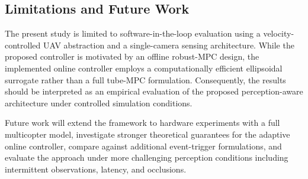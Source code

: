 \documentclass[letterpaper, 10 pt, conference]{ieeeconf}  %
\begin{document}
\subsection{Limitations and Future Work}

The present study is limited to software-in-the-loop evaluation using a velocity-controlled UAV abstraction and a single-camera sensing architecture. While the proposed controller is motivated by an offline robust-MPC design, the implemented online controller employs a computationally efficient ellipsoidal surrogate rather than a full tube-MPC formulation. Consequently, the results should be interpreted as an empirical evaluation of the proposed perception-aware architecture under controlled simulation conditions.

Future work will extend the framework to hardware experiments with a full multicopter model, investigate stronger theoretical guarantees for the adaptive online controller, compare against additional event-trigger formulations, and evaluate the approach under more challenging perception conditions including intermittent observations, latency, and occlusions.

\end{document}
